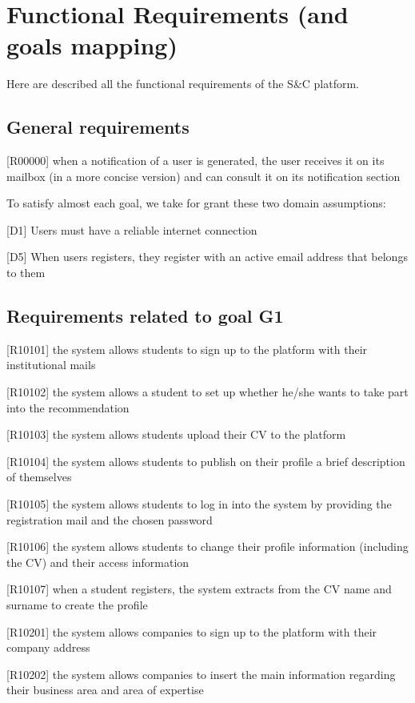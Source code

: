 	\section{Functional Requirements (and goals mapping)}
		Here are described all the functional requirements of the S\&C platform.
		
		\subsection{General requirements}
		
		[R00000] when a notification of a user is generated, the user receives it on its mailbox (in a more concise version) and can consult it on its notification section
		
		To satisfy almost each goal, we take for grant these two domain assumptions:
		

		[D1] Users must have a reliable internet connection
		
		[D5] When users registers, they register with an active email address that belongs to them
		
		\subsection{Requirements related to goal G1}
		
		[R10101] the system allows students to sign up to the platform with their institutional mails
		
		[R10102] the system allows a student to set up whether he/she wants to take part into the recommendation
		
		[R10103] the system allows students upload their CV to the platform
		
		[R10104] the system allows students to publish on their profile a brief description of themselves
		
		[R10105] the system allows students to log in into the system by providing the registration mail and the chosen	password
		
		[R10106] the system allows students to change their profile information (including the CV) and their access information
		
		[R10107] when a student registers, the system extracts from the CV name and surname to create the profile
		
		[R10201] the system allows companies to sign up to the platform with their company address
		
		[R10202] the system allows companies to insert the main information regarding their business area and area of expertise
		
